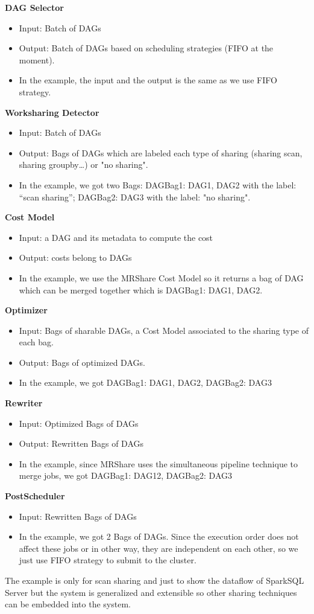 \textbf{DAG Selector}
\begin{itemize}
\item Input: Batch of DAGs
\item Output: Batch of DAGs based on scheduling strategies (FIFO at the moment).
\item In the example, the input and the output is the same as we use FIFO strategy.
\end{itemize}

\textbf{Worksharing Detector}
\begin{itemize}
\item Input: Batch of DAGs
\item Output: Bags of DAGs which are labeled each type of sharing (sharing scan, sharing groupby…) or "no sharing".
\item In the example, we got two Bags: DAGBag1: {DAG1, DAG2} with the label: “scan sharing”; DAGBag2: {DAG3} with the label: "no sharing".
\end{itemize}

\textbf{Cost Model}
\begin{itemize}
\item Input: a DAG and its metadata to compute the cost
\item Output: costs belong to DAGs
\item In the example, we use the MRShare Cost Model so it returns a bag of DAG which can be merged together which is DAGBag1: {DAG1, DAG2}.
\end{itemize}

\textbf{Optimizer}
\begin{itemize}
\item Input: Bags of sharable DAGs, a Cost Model associated to the sharing type of each bag.
\item Output: Bags of optimized DAGs.
\item In the example, we got DAGBag1: {DAG1, DAG2}, DAGBag2: {DAG3}
\end{itemize}

\textbf{Rewriter}
\begin{itemize}
\item Input: Optimized Bags of DAGs
\item Output: Rewritten Bags of DAGs
\item In the example, since MRShare uses the simultaneous pipeline technique to merge jobs, we got DAGBag1: {DAG12}, DAGBag2: {DAG3}
\end{itemize}

\textbf{PostScheduler}
\begin{itemize}
\item Input: Rewritten Bags of DAGs
\item In the example, we got 2 Bags of DAGs. Since the execution order does not affect these jobs or in other way, they are independent on each other, so we just use FIFO strategy to submit to the cluster.
\end{itemize}

The example is only for scan sharing and just to show the dataflow of SparkSQL Server but the system is generalized and extensible so other sharing techniques can be embedded into the system.